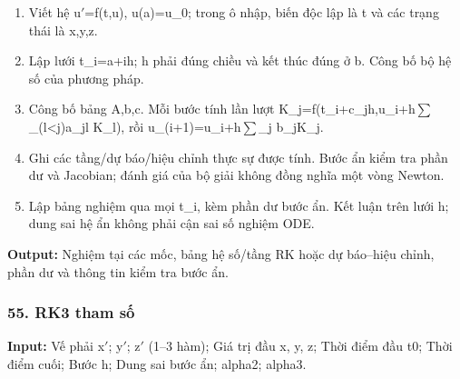 \begin{enumerate}

\item Viết hệ u\ensuremath{\prime}=\allowbreak{}f(\allowbreak{}t,\allowbreak{}u),\allowbreak{} u(\allowbreak{}a)=\allowbreak{}u\_0;\allowbreak{} trong ô nhập,\allowbreak{} biến độc lập là t và các trạng thái là x,\allowbreak{}y,\allowbreak{}z.

\item Lập lưới t\_i=\allowbreak{}a+\allowbreak{}ih;\allowbreak{} h phải đúng chiều và kết thúc đúng ở b. Công bố bộ hệ số của phương pháp.

\item Công bố bảng A,\allowbreak{}b,\allowbreak{}c. Mỗi bước tính lần lượt K\_j=\allowbreak{}f(\allowbreak{}t\_i+\allowbreak{}c\_jh,\allowbreak{}u\_i+\allowbreak{}h\ensuremath{\sum}\_(\allowbreak{}l<j)a\_jl K\_l),\allowbreak{} rồi u\_(\allowbreak{}i+\allowbreak{}1)=\allowbreak{}u\_i+\allowbreak{}h\ensuremath{\sum}\_j b\_jK\_j.

\item Ghi các tầng/\allowbreak{}dự báo/\allowbreak{}hiệu chỉnh thực sự được tính. Bước ẩn kiểm tra phần dư và Jacobian;\allowbreak{} đánh giá của bộ giải không đồng nghĩa một vòng Newton.

\item Lập bảng nghiệm qua mọi t\_i,\allowbreak{} kèm phần dư bước ẩn. Kết luận trên lưới h;\allowbreak{} dung sai hệ ẩn không phải cận sai số nghiệm ODE.

\end{enumerate}

\textbf{Output:} Nghiệm tại các mốc,\allowbreak{} bảng hệ số/\allowbreak{}tầng RK hoặc dự báo–hiệu chỉnh,\allowbreak{} phần dư và thông tin kiểm tra bước ẩn.

\examplebreak\subsubsection*{55. RK3 tham số}

\textbf{Input:} Vế phải x\ensuremath{\prime};\allowbreak{} y\ensuremath{\prime};\allowbreak{} z\ensuremath{\prime} (\allowbreak{}1–3 hàm);\allowbreak{} Giá trị đầu x,\allowbreak{} y,\allowbreak{} z;\allowbreak{} Thời điểm đầu t0;\allowbreak{} Thời điểm cuối;\allowbreak{} Bước h;\allowbreak{} Dung sai bước ẩn;\allowbreak{} alpha2;\allowbreak{} alpha3.

